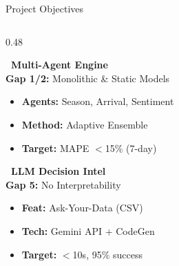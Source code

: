 \documentclass{beamer}
\begin{document}
\begin{frame}[label=objectives]{Project Objectives}

\vspace{0.1cm}

\begin{columns}[T]
\begin{column}{0.48\textwidth}
\begin{tcolorbox}[enhanced, colback=primaryblue!3, colframe=gray!15,
  boxrule=0.4pt, arc=4pt, drop fuzzy shadow=black!10,
  borderline west={3pt}{0pt}{accentblue},
  left=5pt, right=5pt, top=4pt, bottom=4pt]
\scriptsize
{\color{primaryblue}\bfseries\normalsize {}~Multi-Agent Engine}\\[2pt]
{\color{black!60}\textbf{Gap 1/2:} Monolithic \& Static Models}
\vspace{0.04cm}
\begin{itemize}\setlength\itemsep{1pt}
\item[\color{primaryblue}\faAngleRight] \textbf{Agents:} Season, Arrival, Sentiment
\item[\color{primaryblue}\faAngleRight] \textbf{Method:} Adaptive Ensemble
\item[\color{primaryblue}\faAngleRight] \textbf{Target:} MAPE $<$15\% (7-day)
\end{itemize}
\end{tcolorbox}

\vspace{0.08cm}

\begin{tcolorbox}[enhanced, colback=accentpurple!3, colframe=gray!15,
  boxrule=0.4pt, arc=4pt, drop fuzzy shadow=black!10,
  borderline west={3pt}{0pt}{accentpurple},
  left=5pt, right=5pt, top=4pt, bottom=4pt]
\scriptsize
{\color{accentpurple}\bfseries\normalsize {}~LLM Decision Intel}\\[2pt]
{\color{black!60}\textbf{Gap 5:} No Interpretability}
\vspace{0.04cm}
\begin{itemize}\setlength\itemsep{1pt}
\item[\color{accentpurple}\faAngleRight] \textbf{Feat:} Ask-Your-Data (CSV)
\item[\color{accentpurple}\faAngleRight] \textbf{Tech:} Gemini API + CodeGen
\item[\color{accentpurple}\faAngleRight] \textbf{Target:} $<$10s, 95\% success
\end{itemize}
\end{tcolorbox}
\end{column}


\end{columns}
\end{frame}
\end{document}
